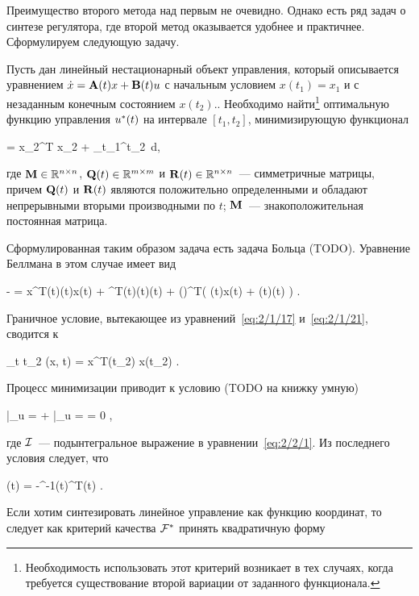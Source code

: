 Преимущество второго метода над первым не очевидно. Однако есть ряд задач о синтезе регулятора, где второй метод оказывается удобнее и практичнее. Сформулируем следующую задачу.

Пусть дан линейный нестационарный объект управления, который описывается уравнением $\dot{x} = \mathbf{A}(t)x + \mathbf{B}(t)u$ с начальным условием $x(t_1) = x_1$ и с незаданным конечным состоянием $x(t_2)$.. Необходимо найти\footnote{ Необходимость использовать этот критерий возникает в тех случаях, когда требуется существование второй вариации от заданного функционала. } оптимальную функцию управления $u^{*}(t)$ на интервале $[t_1, t_2]$, минимизирующую функционал

    \funcF =  x_2^T \mM x_2 +  \int\limits_{t_1}^{t_2} \,d\tau \mbox{,}
\eeq

где $\mathbf{M} \in \mathbb{R}^{{n} \times {n}}$, $\mathbf{Q}(t) \in \mathbb{R}^{{m} \times {m}}$ и $\mathbf{R}(t) \in \mathbb{R}^{{n} \times {n}}$~--- симметричные матрицы, причем $\mathbf{Q}(t)$ и $\mathbf{R}(t)$ являются положительно определенными и обладают непрерывными вторыми производными по $t$; $\mathbf{M}$~--- знакоположительная постоянная матрица.

Сформулированная таким образом задача есть задача Больца (TODO). Уравнение Беллмана в этом случае имеет вид

    -  =  x^T(t)\mQ(t)x(t) +  \optU^T(t)\mR(t)\optU(t) + \biggl(\biggr)^T\bigl( \mA(t)x(t) + \mB(t)\optU(t) \bigr) \mbox{.}
\eeq

Граничное условие, вытекающее из уравнений~\vref{eq:2/1/17} и~\vref{eq:2/1/21}, сводится к

    \lim_{t \to t_2} \optF(x, t) =  x^T(t_2) \mM x(t_2) \mbox{.}
\eeq

Процесс минимизации приводит к условию (TODO на книжку умную)

     \biggm|_{u = \optU} +   \Biggm|_{u = \optU} = 0 \mbox{,}
\eeq

где $\mathcal{I}$~--- подынтегральное выражение в уравнении~\ref{eq:2/2/1}. Из последнего условия следует, что

    \optU(t) = -\mR^{-1}(t)\mB^T(t)  \mbox{.}
\eeq

Если хотим синтезировать линейное управление как функцию координат, то следует как критерий качества $\mathcal{F}^{*}$ принять квадратичную форму


